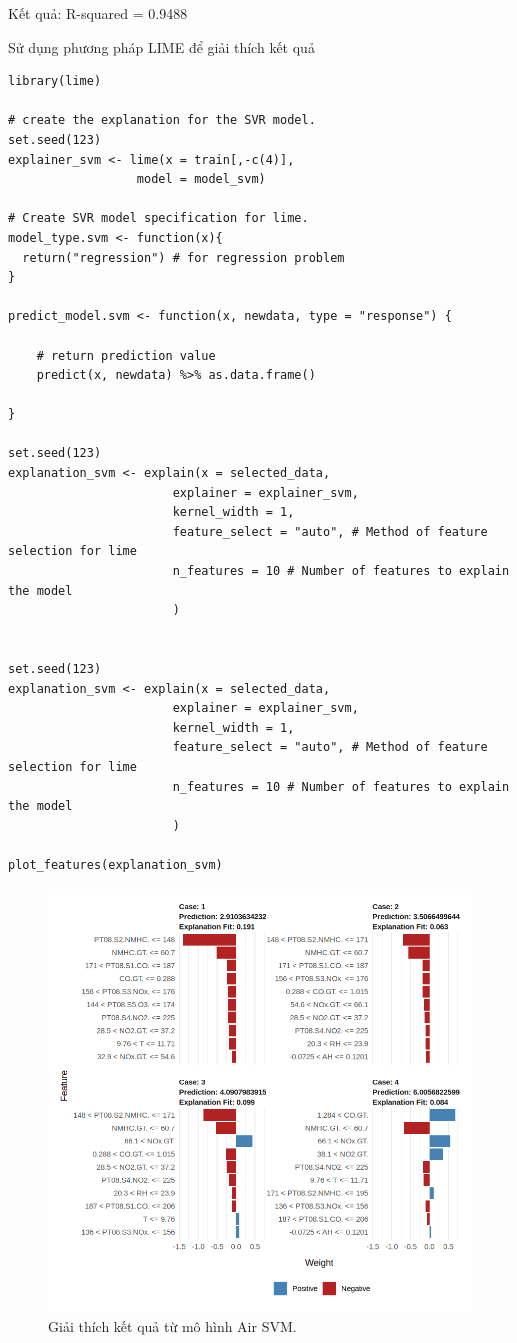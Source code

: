 Kết quả: R-squared = 0.9488


Sử dụng phương pháp LIME để giải thích kết quả
\begin{lstlisting}
library(lime)

# create the explanation for the SVR model.
set.seed(123)
explainer_svm <- lime(x = train[,-c(4)], 
                  model = model_svm)

# Create SVR model specification for lime.
model_type.svm <- function(x){
  return("regression") # for regression problem
}

predict_model.svm <- function(x, newdata, type = "response") {

    # return prediction value
    predict(x, newdata) %>% as.data.frame()
    
}

set.seed(123)
explanation_svm <- explain(x = selected_data, 
                       explainer = explainer_svm,
                       kernel_width = 1,
                       feature_select = "auto", # Method of feature selection for lime
                       n_features = 10 # Number of features to explain the model
                       )


set.seed(123)
explanation_svm <- explain(x = selected_data, 
                       explainer = explainer_svm,
                       kernel_width = 1,
                       feature_select = "auto", # Method of feature selection for lime
                       n_features = 10 # Number of features to explain the model
                       )

plot_features(explanation_svm)
\end{lstlisting}
\begin{figure}[H]
    \centering
    \includegraphics[width=0.75\columnwidth]{air_figures/air_lime_svm.png}
    \caption{Giải thích kết quả từ mô hình Air SVM.}
    \label{fig:air_lime_svm}
\end{figure}

